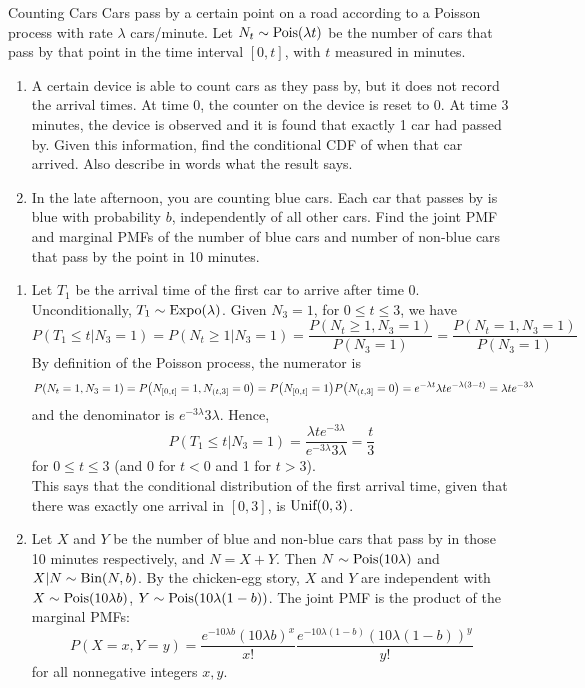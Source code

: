 \documentclass[11.5pt]{article}
\begin{document}
\begin{exercise}{Counting Cars}
Cars pass by a certain point on a road according to a Poisson process with rate $\lambda$ cars/minute. Let $N_t \sim \textrm{Pois}(\lambda t)$ be the number of cars that pass by that point in the time interval $[0, t]$, with $t$ measured in minutes.
\begin{enumerate}
\item A certain device is able to count cars as they pass by, but it does not record the arrival times. At time 0, the counter on the device is reset to 0. At time 3 minutes, the device is observed and it is found that exactly 1 car had passed by. Given this information, find the conditional CDF of when that car arrived. Also describe in words what the result says.

\item In the late afternoon, you are counting blue cars. Each car that passes by is blue with probability $b$, independently of all other cars. Find the joint PMF and marginal PMFs of the number of blue cars and number of non-blue cars that pass by the point in 10 minutes.
\end{enumerate}
\end{exercise}

\begin{solution}{3.5}
\vspace{-5mm}
\begin{enumerate}
    \item Let $T_1$ be the arrival time of the first car to arrive after time 0. Unconditionally, $T_1 \sim \textrm{Expo}(\lambda)$. Given $N_3 = 1$, for $0 \leq t \leq 3$, we have
    $$P(T_1 \leq t | N_3 = 1) = P(N_t \geq 1 | N_3 = 1) = \frac{P(N_t \geq 1, N_3 = 1)}{P(N_3 = 1)} = \frac{P(N_t = 1, N_3 = 1)}{P(N_3 = 1)}$$
    By definition of the Poisson process, the numerator is
    $$P(N_t = 1, N_3 = 1) = P\paren{N_{[0, t]} = 1, N_{(t, 3]} = 0} = P\paren{N_{[0, t]} = 1}P\paren{N_{(t, 3]} = 0} = e^{-\lambda t}\lambda t e^{-\lambda(3 - t)} = \lambda t e^{-3 \lambda}$$
    and the denominator is $e^{-3\lambda} 3 \lambda$. Hence,
    $$P(T_1 \leq t | N_3 = 1) = \frac{\lambda t e^{-3 \lambda}}{e^{-3\lambda} 3 \lambda} = \frac{t}{3}$$
    for $0 \leq t \leq 3$ (and 0 for $t < 0$ and 1 for $t > 3$). \\
    This says that the conditional distribution of the first arrival time, given that there was exactly one arrival in $[0, 3]$, is $\textrm{Unif}(0, 3)$.
    \item Let $X$ and $Y$ be the number of blue and non-blue cars that pass by in those 10 minutes respectively, and $N = X + Y$. Then $N \sim \textrm{Pois}(10\lambda)$ and $X|N \sim \textrm{Bin}(N, b)$. By the chicken-egg story, $X$ and $Y$ are independent with $X \sim \textrm{Pois}(10 \lambda b)$, $Y \sim \textrm{Pois}(10 \lambda (1 - b))$. The joint PMF is the product of the marginal PMFs:
    $$P(X = x, Y = y) = \frac{e^{-10 \lambda b}(10 \lambda b)^x}{x!}\frac{e^{-10 \lambda (1 - b)}(10 \lambda (1 - b))^y}{y!}$$
    for all nonnegative integers $x, y$.
\end{enumerate}
\end{solution}
\end{document}
